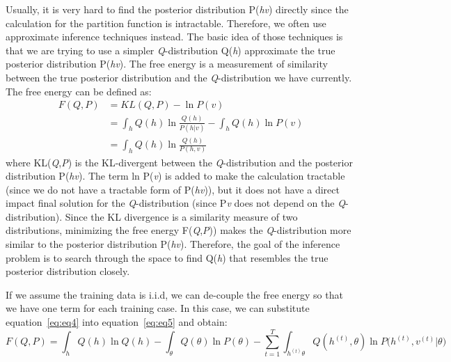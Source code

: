 \documentclass{article} %
\begin{document}
Usually, it is very hard to find the posterior distribution P(\textit{h}\textbar\textit{v}) directly since the calculation for the partition function is intractable. Therefore, we often use approximate inference techniques instead. The basic idea of those techniques is that we are trying to use a simpler \textit{Q}-distribution Q(\textit{h}) approximate the true posterior distribution P(\textit{h}\textbar\textit{v}). The free energy is a measurement of similarity between the true posterior distribution and the \textit{Q}-distribution we have currently. The free energy can be defined as:
\begin{equation} \label{eq:eq5}
\begin{split}
F(Q,P) &= KL(Q,P) - \ln P(v) \\
& = \int_{h} Q(h)\ln \frac{Q(h)}{P(h|v)} - \int_{h} Q(h)\ln P(v) \\
& = \int_{h} Q(h)\ln \frac{Q(h)}{P(h,v)} 
\end{split}
\end{equation}
where KL(\textit{Q},\textit{P}) is the KL-divergent between the \textit{Q}-distribution and the posterior distribution P(\textit{h}\textbar\textit{v}). The term ln P(\textit{v}) is added to make the calculation tractable (since we do not have a tractable form of P(\textit{h}\textbar\textit{v})), but it does not have a direct impact final solution for the \textit{Q}-distribution (since P\textit{v} does not depend on the \textit{Q}-distribution). Since the KL divergence is a similarity measure of two distributions, minimizing the free energy F(\textit{Q},\textit{P})) makes the \textit{Q}-distribution more similar to the posterior distribution P(\textit{h}\textbar\textit{v}). Therefore, the goal of the inference problem is to search through the space to find Q(\textit{h}) that resembles the true posterior distribution closely. 

If we assume the training data is i.i.d, we can de-couple the free energy so that we have one term for each training case. In this case, we can substitute equation~\ref{eq:eq4} into equation~\ref{eq:eq5} and obtain:
\begin{equation}
F(Q,P) = \int_{h} Q(h)\ln Q(h) - \int_{\theta} Q(\theta)\ln P(\theta) - \sum_{t=1}^T \int_{h^{(t)}\theta}Q(h^{(t)},\theta)\ln P\Big(h^{(t)}, v^{(t)}|\theta\Big) 
\label{eq:eq6}
\end{equation}
\end{document}
